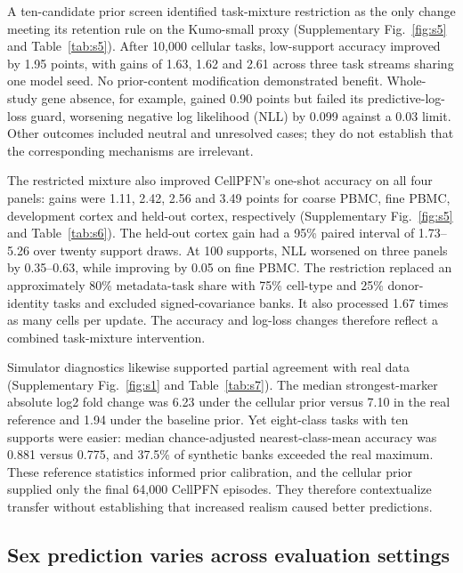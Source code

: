 A ten-candidate prior screen identified task-mixture restriction as the only change meeting its retention rule on the Kumo-small proxy (Supplementary Fig.~\ref{fig:s5} and Table~\ref{tab:s5}). After 10,000 cellular tasks, low-support accuracy improved by 1.95 points, with gains of 1.63, 1.62 and 2.61 across three task streams sharing one model seed. No prior-content modification demonstrated benefit. Whole-study gene absence, for example, gained 0.90 points but failed its predictive-log-loss guard, worsening negative log likelihood (NLL) by 0.099 against a 0.03 limit. Other outcomes included neutral and unresolved cases; they do not establish that the corresponding mechanisms are irrelevant.

The restricted mixture also improved CellPFN's one-shot accuracy on all four panels: gains were 1.11, 2.42, 2.56 and 3.49 points for coarse PBMC, fine PBMC, development cortex and held-out cortex, respectively (Supplementary Fig.~\ref{fig:s5} and Table~\ref{tab:s6}). The held-out cortex gain had a 95\% paired interval of 1.73--5.26 over twenty support draws. At 100 supports, NLL worsened on three panels by 0.35--0.63, while improving by 0.05 on fine PBMC. The restriction replaced an approximately 80\% metadata-task share with 75\% cell-type and 25\% donor-identity tasks and excluded signed-covariance banks. It also processed 1.67 times as many cells per update. The accuracy and log-loss changes therefore reflect a combined task-mixture intervention.

Simulator diagnostics likewise supported partial agreement with real data (Supplementary Fig.~\ref{fig:s1} and Table~\ref{tab:s7}). The median strongest-marker absolute log2 fold change was 6.23 under the cellular prior versus 7.10 in the real reference and 1.94 under the baseline prior. Yet eight-class tasks with ten supports were easier: median chance-adjusted nearest-class-mean accuracy was 0.881 versus 0.775, and 37.5\% of synthetic banks exceeded the real maximum. These reference statistics informed prior calibration, and the cellular prior supplied only the final 64,000 CellPFN episodes. They therefore contextualize transfer without establishing that increased realism caused better predictions.

\subsection*{Sex prediction varies across evaluation settings}

